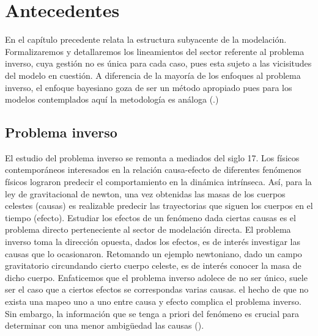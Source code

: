 
\chapter{Antecedentes}

En el capítulo precedente relata la estructura subyacente de la modelación. Formalizaremos y detallaremos los lineamientos  del sector referente al problema inverso, cuya gestión no es única para cada caso, pues esta sujeto a las vicisitudes del modelo en cuestión. A diferencia de la mayoría de los enfoques al problema inverso, el enfoque bayesiano goza de ser un método apropiado pues para los modelos contemplados aquí la metodología es análoga (\cite{tarantola2005inverse}.)



\section{Problema inverso}

El estudio del problema inverso se remonta a mediados del siglo 17. Los físicos contemporáneos interesados en la relación causa-efecto de diferentes fenómenos físicos lograron predecir el comportamiento en la dinámica intrínseca. Así, para la ley de gravitacional de newton, una vez obtenidas las masas de los cuerpos celestes (causas) es realizable predecir las trayectorias que siguen los cuerpos en el tiempo (efecto). Estudiar los efectos de un fenómeno dada ciertas causas es el problema directo perteneciente al sector de modelación directa. El problema inverso toma la dirección opuesta, dados los efectos, es de interés investigar las causas que lo ocasionaron. Retomando un ejemplo newtoniano, dado un campo gravitatorio circundando cierto cuerpo celeste, es de interés conocer la masa de dicho cuerpo. Enfaticemos que el problema inverso adolece de no ser único, suele ser el caso que a ciertos efectos se correspondas varias causas. el hecho de que no exista una mapeo uno a uno entre causa y efecto complica el problema inverso. Sin embargo, la información que se tenga a priori del fenómeno es crucial para determinar con una menor ambigüedad las causas (\cite{tarantola2005inverse}). 

